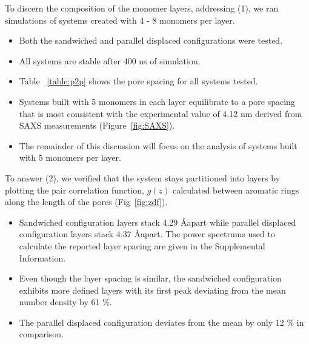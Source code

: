 \documentclass{article}
\newcommand{\angstrom}{\textup{\AA}}
\begin{document}
  To discern the composition of the monomer layers, addressing (1), we ran
  simulations of systems created with 4 - 8 monomers per layer.  %
  \begin{itemize}
        \item Both the sandwiched and parallel displaced configurations were tested.
        \item All systems are stable after 400 ns of simulation.  %
        \item Table ~\ref{table:p2p} shows the pore spacing for all systems tested.
        \item Systems built with 5 monomers in each layer equilibrate to a pore spacing
        that is most consistent with the experimental value of 4.12 nm derived from
        SAXS measurements (Figure~\ref{fig:SAXS}).
        \item The remainder of this discussion will focus on the analysis of systems
        built with 5 monomers per layer.
  \end{itemize}


  To answer (2), we verified that the system stays partitioned into layers by
  plotting the pair correlation function, $g(z)$ calculated between aromatic rings along
  the length of the pores (Fig~\ref{fig:zdf}).
  \begin{itemize}
        \item Sandwiched configuration layers stack 4.29 \angstrom apart while
        parallel displaced configuration layers stack 4.37 \angstrom apart.
        The power spectrums used to calculate the reported layer spacing are given in the 
        Supplemental Information.  %
	\item Even though the layer spacing is similar, the sandwiched configuration
	exhibits more defined layers with its first peak deviating from the mean 
        number density by 61 \%. %
	\item The parallel displaced configuration deviates from the mean by only 
	12 \% in comparison.
  \end{itemize}
\end{document}
